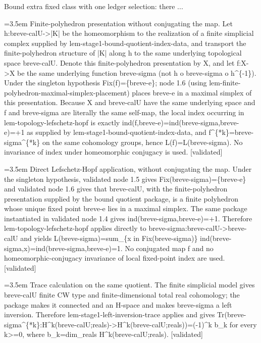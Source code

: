 \documentclass{article}
\newcommand{\step}[1]{\par\noindent\hangindent=3.5em\hangafter=1%
  \makebox[3.5em][l]{\textbf{#1.}}}
\newcommand{\steptag}[1]{\hfill{\small\textsf{[#1]}}}
\begin{document}
\begin{proofbox}{Bound extra fixed class with one ledger selection: there ...}
\step{1.7.1} Finite-polyhedron presentation without conjugating the map. Let h:breve-calU->|K| be the homeomorphism to the realization of a finite simplicial complex supplied by lem-stage1-bound-quotient-index-data, and transport the finite-polyhedron structure of |K| along h to the same underlying topological space breve-calU. Denote this finite-polyhedron presentation by X, and let f:X->X be the same underlying function breve-sigma (not h o breve-sigma o h\textasciicircum{}\{-1\}). Under the singleton hypothesis Fix(f)=\{breve-e\}; node 1.6 (using lem-finite-polyhedron-maximal-simplex-placement) places breve-e in a maximal simplex of this presentation. Because X and breve-calU have the same underlying space and f and breve-sigma are literally the same self-map, the local index occurring in lem-topology-lefschetz-hopf is exactly ind(f,breve-e)=ind(breve-sigma,breve-e)=+1 as supplied by lem-stage1-bound-quotient-index-data, and f\textasciicircum{}\{*k\}=breve-sigma\textasciicircum{}\{*k\} on the same cohomology groups, hence L(f)=L(breve-sigma). No invariance of index under homeomorphic conjugacy is used. \steptag{validated} \\[4pt]
\step{1.7.2} Direct Lefschetz-Hopf application, without conjugating the map. Under the singleton hypothesis, validated node 1.5 gives Fix(breve-sigma)=\{breve-e\} and validated node 1.6 gives that breve-calU, with the finite-polyhedron presentation supplied by the bound quotient package, is a finite polyhedron whose unique fixed point breve-e lies in a maximal simplex. The same package instantiated in validated node 1.4 gives ind(breve-sigma,breve-e)=+1. Therefore lem-topology-lefschetz-hopf applies directly to breve-sigma:breve-calU->breve-calU and yields L(breve-sigma)=sum\_\{x in Fix(breve-sigma)\} ind(breve-sigma,x)=ind(breve-sigma,breve-e)=1. No conjugated map f and no homeomorphic-conjugacy invariance of local fixed-point index are used. \steptag{validated} \\[4pt]
\step{1.8} Trace calculation on the same quotient. The finite simplicial model gives breve-calU finite CW type and finite-dimensional total real cohomology; the package makes it connected and an H-space and makes breve-sigma a left inversion. Therefore lem-stage1-left-inversion-trace applies and gives Tr(breve-sigma\textasciicircum{}\{*k\}:H\textasciicircum{}k(breve-calU;reals)->H\textasciicircum{}k(breve-calU;reals))=(-1)\textasciicircum{}k b\_k for every k>=0, where b\_k=dim\_reals H\textasciicircum{}k(breve-calU;reals). \steptag{validated} \\[4pt]

\end{proofbox}
\end{document}
